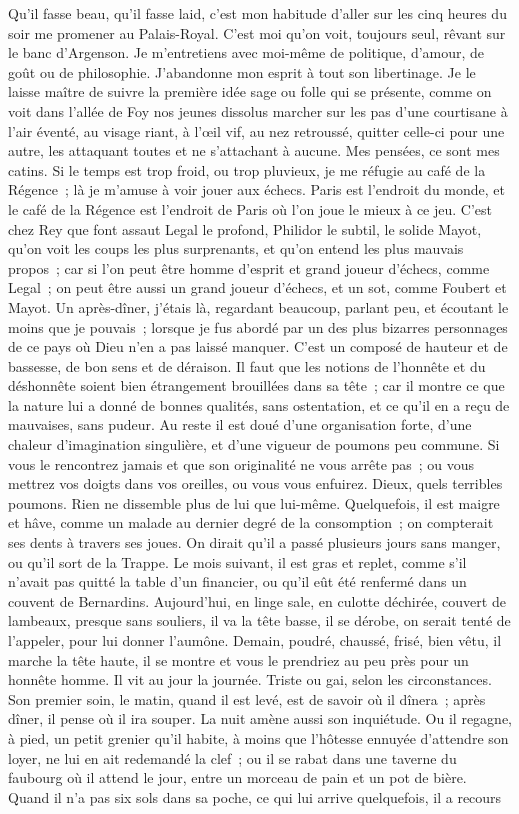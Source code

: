 \documentclass[french,twoside]{book} %
\begin{document}
\noindent Qu’il fasse beau, qu’il fasse laid, c’est mon habitude d’aller sur les cinq heures du soir me promener au Palais-Royal. C’est moi qu’on voit, toujours seul, rêvant sur le banc d’Argenson. Je m’entretiens avec moi-même de politique, d’amour, de goût ou de philosophie. J’abandonne mon esprit à tout son libertinage. Je le laisse maître de suivre la première idée sage ou folle qui se présente, comme on voit dans l’allée de Foy nos jeunes dissolus marcher sur les pas d’une courtisane à l’air éventé, au visage riant, à l’œil vif, au nez retroussé, quitter celle-ci pour une autre, les attaquant toutes et ne s’attachant à aucune. Mes pensées, ce sont mes catins. Si le temps est trop froid, ou trop pluvieux, je me réfugie au café de la Régence ; là je m’amuse à voir jouer aux échecs. Paris est l’endroit du monde, et le café de la Régence est l’endroit de Paris où l’on joue le mieux à ce jeu. C’est chez Rey que font assaut Legal le profond, Philidor le subtil, le solide Mayot, qu’on voit les coups les plus surprenants, et qu’on entend les plus mauvais propos ; car si l’on peut être homme d’esprit et grand joueur d’échecs, comme Legal ; on peut être aussi un grand joueur d’échecs, et un sot, comme Foubert et Mayot. Un après-dîner, j’étais là, regardant beaucoup, parlant peu, et écoutant le moins que je pouvais ; lorsque je fus abordé par un des plus bizarres personnages de ce pays où Dieu n’en a pas laissé manquer. C’est un composé de hauteur et de bassesse, de bon sens et de déraison. Il faut que les notions de l’honnête et du déshonnête soient bien étrangement brouillées dans sa tête ; car il montre ce que la nature lui a donné de bonnes qualités, sans ostentation, et ce qu’il en a reçu de mauvaises, sans pudeur. Au reste il est doué d’une organisation forte, d’une chaleur d’imagination singulière, et d’une vigueur de poumons peu commune. Si vous le rencontrez jamais et que son originalité ne vous arrête pas ; ou vous mettrez vos doigts dans vos oreilles, ou vous vous enfuirez. Dieux, quels terribles poumons. Rien ne dissemble plus de lui que lui-même. Quelquefois, il est maigre et hâve, comme un malade au dernier degré de la consomption ; on compterait ses dents à travers ses joues. On dirait qu’il a passé plusieurs jours sans manger, ou qu’il sort de la Trappe. Le mois suivant, il est gras et replet, comme s’il n’avait pas quitté la table d’un financier, ou qu’il eût été renfermé dans un couvent de Bernardins. Aujourd’hui, en linge sale, en culotte déchirée, couvert de lambeaux, presque sans souliers, il va la tête basse, il se dérobe, on serait tenté de l’appeler, pour lui donner l’aumône. Demain, poudré, chaussé, frisé, bien vêtu, il marche la tête haute, il se montre et vous le prendriez au peu près pour un honnête homme. Il vit au jour la journée. Triste ou gai, selon les circonstances. Son premier soin, le matin, quand il est levé, est de savoir où il dînera ; après dîner, il pense où il ira souper. La nuit amène aussi son inquiétude. Ou il regagne, à pied, un petit grenier qu’il habite, à moins que l’hôtesse ennuyée d’attendre son loyer, ne lui en ait redemandé la clef ; ou il se rabat dans une taverne du faubourg où il attend le jour, entre un morceau de pain et un pot de bière. Quand il n’a pas six sols dans sa poche, ce qui lui arrive quelquefois, il a recours 
\end{document}
